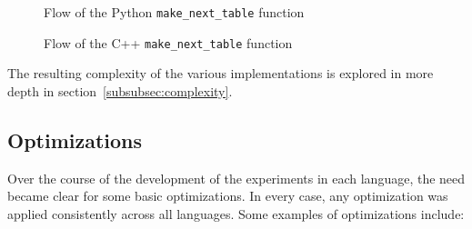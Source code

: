 \begin{figure}[ht]
    \centering
    \begin{minipage}[t]{0.45\textwidth}
        \centering
        
        \caption{Flow of the Python \texttt{make\_next\_table} function}
        \label{fig:graph-kmp-py}
    \end{minipage}\hfill
    \begin{minipage}[t]{0.45\textwidth}
        \centering
        
        \caption{Flow of the C++ \texttt{make\_next\_table} function}
        \label{fig:graph-kmp-cpp}
    \end{minipage}
\end{figure}

The resulting complexity of the various implementations is explored in more depth in section~\ref{subsubsec:complexity}.

\subsection{Optimizations}

Over the course of the development of the experiments in each language, the need became clear for some basic optimizations. In every case, any optimization was applied consistently across all languages. Some examples of optimizations include:

